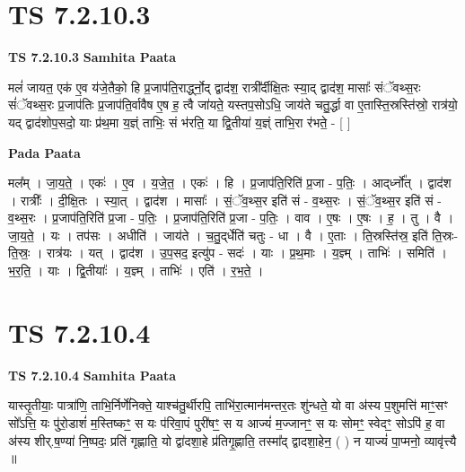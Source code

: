 \documentclass[17pt]{extarticle}
\begin{document}

\section{ TS 7.2.10.3 }

\textbf{TS 7.2.10.3 } \newline
\textbf{Samhita Paata} \newline

मलं॑ जायत॒ एक॑ ए॒व य॑जे॒तैको॒ हि प्र॒जाप॑ति॒रार्द्ध्नो॒द् द्वाद॑श॒ रात्री᳚र्दीक्षि॒तः स्या॒द् द्वाद॑श॒ मासाः᳚ संॅवथ्स॒रः सं॑ॅवथ्स॒रः प्र॒जाप॑तिः प्र॒जाप॑ति॒र्वावैष ए॒ष ह॒ त्वै जा॑यते॒ यस्तप॒सोऽधि॒ जाय॑ते चतु॒र्द्धा वा ए॒तास्ति॒स्रस्ति॑स्रो॒ रात्र॑यो॒ यद् द्वाद॑शोप॒सदो॒ याः प्र॑थ॒मा य॒ज्ञ्ं ताभिः॒ सं भ॑रति॒ या द्वि॒तीया॑ य॒ज्ञ्ं ताभि॒रा र॑भते॒ - [  ] \newline

\textbf{Pada Paata} \newline

मल᳚म् । जा॒य॒ते॒ । एकः॑ । ए॒व । य॒जे॒त॒ । एकः॑ । हि । प्र॒जाप॑ति॒रिति॑ प्र॒जा - प॒तिः॒ । आद्‌र्ध्नो᳚त् । द्वाद॑श । रात्रीः᳚ । दी॒क्षि॒तः । स्या॒त् । द्वाद॑श । मासाः᳚ । सं॒ॅव॒थ्स॒र इति॑ सं - व॒थ्स॒रः । सं॒ॅव॒थ्स॒र इति॑ सं - व॒थ्स॒रः । प्र॒जाप॑ति॒रिति॑ प्र॒जा - प॒तिः॒ । प्र॒जाप॑ति॒रिति॑ प्र॒जा - प॒तिः॒ । वाव । ए॒षः । ए॒षः । ह॒ । तु । वै । जा॒य॒ते॒ । यः । तप॑सः । अधीति॑ । जाय॑ते । च॒तु॒द्‌र्धेति॑ चतुः - धा । वै । ए॒ताः । ति॒स्रस्ति॑स्र॒ इति॑ ति॒स्रः-ति॒स्रः॒ । रात्र॑यः । यत् । द्वाद॑श । उ॒प॒सद॒ इत्यु॑प - सदः॑ । याः । प्र॒थ॒माः । य॒ज्ञ्म् । ताभिः॑ । समिति॑ । भ॒र॒ति॒ । याः । द्वि॒तीयाः᳚ । य॒ज्ञ्म् । ताभिः॑ । एति॑ । र॒भ॒ते॒ ।  \newline





\section{ TS 7.2.10.4 }

\textbf{TS 7.2.10.4 } \newline
\textbf{Samhita Paata} \newline

यास्तृ॒तीयाः॒ पात्रा॑णि॒ ताभि॒र्निर्णे॑निक्ते॒ याश्च॑तु॒र्थीरपि॒ ताभि॑रा॒त्मान॑मन्तर॒तः शु॑न्धते॒ यो वा अ॑स्य प॒शुमत्ति॑ माꣳ॒॒सꣳ सो᳚ऽत्ति॒ यः पु॑रो॒डाशं॑ म॒स्तिष्कꣳ॒॒ स यः प॑रिवा॒पं पुरी॑षꣳ॒॒ स य आज्यं॑ म॒ज्जानꣳ॒॒ स यः सोमꣳ॒॒ स्वेदꣳ॒॒ सोऽपि॑ ह॒ वा अ॑स्य शीर्.ष॒ण्या॑ नि॒ष्पदः॒ प्रति॑ गृह्णाति॒ यो द्वा॑दशा॒हे प्र॑तिगृ॒ह्णाति॒ तस्मा᳚द् द्वादशा॒हेन॒ ( ) न याज्यं॑ पा॒प्मनो॒ व्यावृ॑त्त्यै ॥ \newline
\end{document}
